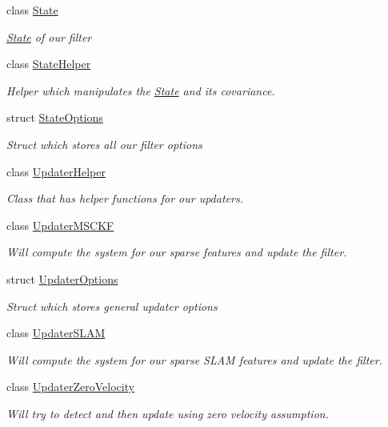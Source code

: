 \begin{DoxyCompactItemize}
class \hyperlink{classov__msckf_1_1State}{State}
\begin{DoxyCompactList}\small\item\em \hyperlink{classov__msckf_1_1State}{State} of our filter \end{DoxyCompactList}\item 
class \hyperlink{classov__msckf_1_1StateHelper}{State\+Helper}
\begin{DoxyCompactList}\small\item\em Helper which manipulates the \hyperlink{classov__msckf_1_1State}{State} and its covariance. \end{DoxyCompactList}\item 
struct \hyperlink{structov__msckf_1_1StateOptions}{State\+Options}
\begin{DoxyCompactList}\small\item\em Struct which stores all our filter options \end{DoxyCompactList}\item 
class \hyperlink{classov__msckf_1_1UpdaterHelper}{Updater\+Helper}
\begin{DoxyCompactList}\small\item\em Class that has helper functions for our updaters. \end{DoxyCompactList}\item 
class \hyperlink{classov__msckf_1_1UpdaterMSCKF}{Updater\+M\+S\+C\+KF}
\begin{DoxyCompactList}\small\item\em Will compute the system for our sparse features and update the filter. \end{DoxyCompactList}\item 
struct \hyperlink{structov__msckf_1_1UpdaterOptions}{Updater\+Options}
\begin{DoxyCompactList}\small\item\em Struct which stores general updater options \end{DoxyCompactList}\item 
class \hyperlink{classov__msckf_1_1UpdaterSLAM}{Updater\+S\+L\+AM}
\begin{DoxyCompactList}\small\item\em Will compute the system for our sparse S\+L\+AM features and update the filter. \end{DoxyCompactList}\item 
class \hyperlink{classov__msckf_1_1UpdaterZeroVelocity}{Updater\+Zero\+Velocity}
\begin{DoxyCompactList}\small\item\em Will try to {\itshape detect} and then update using zero velocity assumption. \end{DoxyCompactList}\item 

\end{DoxyCompactItemize}
